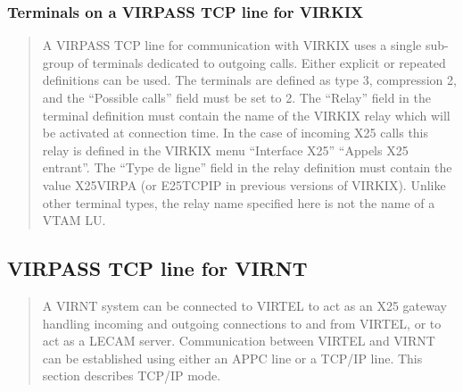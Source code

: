 \documentclass[letterpaper,10pt,english]{sphinxmanual}
\begin{document}
\subsubsection{Terminals on a VIRPASS TCP line for VIRKIX}
\label{\detokenize{connectivity_guide:terminals-on-a-virpass-tcp-line-for-virkix}}\begin{quote}

A VIRPASS TCP line for communication with VIRKIX uses a single sub-group of terminals dedicated to outgoing calls. Either explicit or repeated definitions can be used. The terminals are defined as type 3, compression 2, and the “Possible calls” field must be set to 2. The “Relay” field in the terminal definition must contain the name of the VIRKIX relay which will be activated at connection time. In the case of incoming X25 calls this relay is defined in the VIRKIX menu “Interface X25” \textendash{} “Appels X25 entrant”. The “Type de
ligne” field in the relay definition must contain the value X25VIRPA (or E25TCPIP in previous versions of VIRKIX). Unlike other terminal types, the relay name specified here is not the name of a VTAM LU.
\end{quote}




\subsection{VIRPASS TCP line for VIRNT}
\label{\detokenize{connectivity_guide:virpass-tcp-line-for-virnt}}\begin{quote}

A VIRNT system can be connected to VIRTEL to act as an X25 gateway handling incoming and outgoing connections to and from VIRTEL, or to act as a LECAM server. Communication between VIRTEL and VIRNT can be established using either an APPC line or a TCP/IP line. This section describes TCP/IP mode.
\end{quote}

\end{document}
